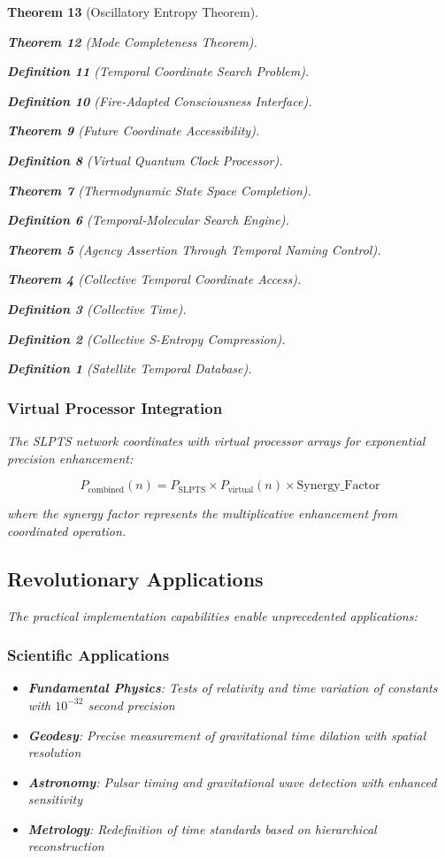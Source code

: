 \documentclass[12pt,a4paper]{article}
\newtheorem{theorem}{Theorem}[section]
\newtheorem{definition}[theorem]{Definition}
\begin{document}
\begin{theorem}[Oscillatory Entropy Theorem]
\begin{theorem}[Mode Completeness Theorem]
\begin{enumerate}
\begin{definition}[Temporal Coordinate Search Problem]
\begin{algorithm}
\begin{definition}[Fire-Adapted Consciousness Interface]
\begin{theorem}[Future Coordinate Accessibility]
\begin{definition}[Virtual Quantum Clock Processor]
\begin{itemize}
\begin{itemize}
\begin{theorem}[Thermodynamic State Space Completion]
\begin{definition}[Temporal-Molecular Search Engine]
\begin{theorem}[Agency Assertion Through Temporal Naming Control]
\begin{remark}
\begin{theorem}[Collective Temporal Coordinate Access]
\begin{definition}[Collective Time]
\begin{definition}[Collective S-Entropy Compression]
\begin{definition}[Satellite Temporal Database]
\begin{algorithm}
\begin{table}[h]
{{\subsubsection{Virtual Processor Integration}

The SLPTS network coordinates with virtual processor arrays for exponential precision enhancement:

\begin{equation}
P_{\text{combined}}(n) = P_{\text{SLPTS}} \times P_{\text{virtual}}(n) \times \text{Synergy\_Factor}
\end{equation}

where the synergy factor represents the multiplicative enhancement from coordinated operation.

\subsection{Revolutionary Applications}

The practical implementation capabilities enable unprecedented applications:

\subsubsection{Scientific Applications}

\begin{itemize}
\item \textbf{Fundamental Physics}: Tests of relativity and time variation of constants with $10^{-32}$ second precision
\item \textbf{Geodesy}: Precise measurement of gravitational time dilation with spatial resolution
\item \textbf{Astronomy}: Pulsar timing and gravitational wave detection with enhanced sensitivity
\item \textbf{Metrology}: Redefinition of time standards based on hierarchical reconstruction
\end{itemize}

}}
\end{table}
\end{algorithm}
\end{definition}
\end{definition}
\end{definition}
\end{theorem}
\end{remark}
\end{theorem}
\end{definition}
\end{theorem}
\end{itemize}
\end{itemize}
\end{definition}
\end{theorem}
\end{definition}
\end{algorithm}
\end{definition}
\end{enumerate}
\end{theorem}
\end{theorem}
\end{document}
